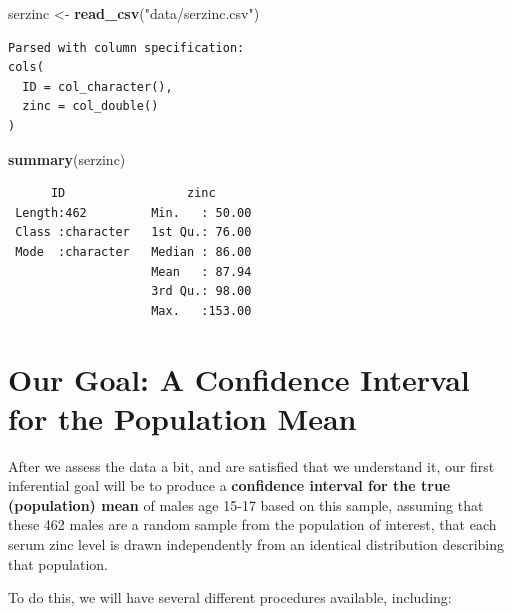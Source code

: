 \documentclass[
]{book}
\newenvironment{Shaded}{\begin{snugshade}}{\end{snugshade}}
\newcommand{\KeywordTok}[1]{\textcolor[rgb]{0.13,0.29,0.53}{\textbf{#1}}}
\newcommand{\NormalTok}[1]{#1}
\newcommand{\StringTok}[1]{\textcolor[rgb]{0.31,0.60,0.02}{#1}}
\begin{document}
\begin{Shaded}
\begin{Highlighting}[]
\NormalTok{serzinc <-}\StringTok{ }\KeywordTok{read_csv}\NormalTok{(}\StringTok{"data/serzinc.csv"}\NormalTok{)}
\end{Highlighting}
\end{Shaded}

\begin{verbatim}
Parsed with column specification:
cols(
  ID = col_character(),
  zinc = col_double()
)
\end{verbatim}

\begin{Shaded}
\begin{Highlighting}[]
\KeywordTok{summary}\NormalTok{(serzinc)}
\end{Highlighting}
\end{Shaded}

\begin{verbatim}
      ID                 zinc       
 Length:462         Min.   : 50.00  
 Class :character   1st Qu.: 76.00  
 Mode  :character   Median : 86.00  
                    Mean   : 87.94  
                    3rd Qu.: 98.00  
                    Max.   :153.00  
\end{verbatim}

\hypertarget{our-goal-a-confidence-interval-for-the-population-mean}{%
\section{Our Goal: A Confidence Interval for the Population Mean}\label{our-goal-a-confidence-interval-for-the-population-mean}}

After we assess the data a bit, and are satisfied that we understand it, our first inferential goal will be to produce a \textbf{confidence interval for the true (population) mean} of males age 15-17 based on this sample, assuming that these 462 males are a random sample from the population of interest, that each serum zinc level is drawn independently from an identical distribution describing that population.

To do this, we will have several different procedures available, including:
\end{document}
